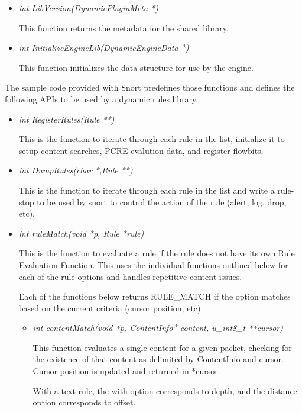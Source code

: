 \documentclass[english]{report}
\begin{document}
\begin{itemize}
\item {\em int LibVersion(DynamicPluginMeta *)}

This function returns the metadata for the shared library.

\item {\em int InitializeEngineLib(DynamicEngineData *)}

This function initializes the data structure for use by the engine.

\end{itemize}

The sample code provided with Snort predefines those functions and defines the
following APIs to be used by a dynamic rules library.

\begin{itemize}
\item {\em int RegisterRules(Rule **)}

This is the function to iterate through each rule in the list, initialize it to
setup content searches, PCRE evalution data, and register flowbits.

\item {\em int DumpRules(char *,Rule **)}

This is the function to iterate through each rule in the list and write a
rule-stop to be used by snort to control the action of the rule (alert, log,
drop, etc).

\item {\em int ruleMatch(void *p, Rule *rule)}

This is the function to evaluate a rule if the rule does not have its own Rule
Evaluation Function.  This uses the individual functions outlined below for
each of the rule options and handles repetitive content issues.  

Each of the functions below returns RULE\_MATCH if the option matches based on
the current criteria (cursor position, etc).

\begin{itemize}

\item {\em int contentMatch(void *p, ContentInfo* content, u\_int8\_t **cursor)}

This function evaluates a single content for a given packet, checking for the
existence of that content as delimited by ContentInfo and cursor.  Cursor
position is updated and returned in *cursor.

With a text rule, the with option corresponds to depth, and the distance option
corresponds to offset.


\end{itemize}
\end{itemize}
\end{document}
